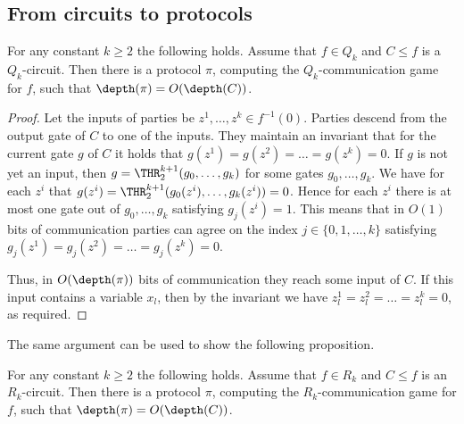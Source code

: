 \subsection{From circuits to protocols} \label{subsec:circ_to_prot}
\begin{proposition}
\label{Q_k_to_protocols}
For any constant $k\ge 2$ the following holds.
Assume that $f\in Q_k$ and $C\le f$ is a $Q_k$-circuit. Then there is a protocol $\pi$, computing the $Q_k$-communication game for $f$, such that $\depth(\pi) =  O(\depth(C))$.
\end{proposition}
\begin{proof}
Let the inputs of parties be $z^1, \ldots, z^k\in f^{-1}(0)$.
Parties descend from the output gate of $C$ to one of the inputs. They maintain an invariant that for the current gate $g$ of $C$ it holds that $g(z^1) = g(z^2) = \ldots = g(z^k) = 0$. If $g$ is not yet an input, then $g = \THR^{k + 1}_2(g_0, \ldots, g_{k})$ for some gates $g_0, \ldots, g_{k}$. We have for each $z^i$ that $g(z^i) =  \THR^{k + 1}_2(g_0(z^i), \ldots, g_{k}(z^i)) = 0$. Hence for each $z^i$ there is at most one gate out of $g_0, \ldots, g_{k}$ satisfying $g_j(z^i) = 1$. This means that in $O(1)$ bits of communication parties can agree on the index $j\in \{0, 1, \ldots, k\}$ satisfying $g_j(z^1) = g_j(z^2) = \ldots = g_j(z^k) = 0$. 

Thus, in $O(\depth(\pi))$ bits of communication they reach some input of $C$. If this input contains a variable $x_l$, then by the invariant we have $z^1_l = z^2_l = \ldots = z_l^k = 0$, as required.
\end{proof}

The same argument can be used to show the following proposition.
\begin{proposition}
\label{R_k_to_protocols}
For any constant $k\ge 2$ the following holds.
Assume that $f\in R_k$ and $C\le f$ is an $R_k$-circuit. Then there is a protocol $\pi$, computing the $R_k$-communication game for $f$, such that $\depth(\pi) =  O(\depth(C))$.
\end{proposition}


